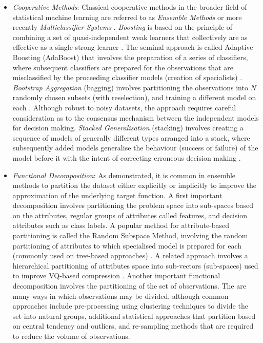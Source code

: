\begin{itemize}
	\item \emph{Cooperative Methods}: Classical cooperative methods in the broader field of statistical machine learning are referred to as \emph{Ensemble Methods} \cite{Opitz1999, Polikar2006} or more recently \emph{Multiclassifier Systems} \cite{Ghosh2002}. \emph{Boosting} is based on the principle of combining a set of quasi-independent weak learners that collectively are as effective as a single strong learner \cite{Kearns1988, Schapire1992}. The seminal approach is called Adaptive Boosting (AdaBoost) that involves the preparation of a series of classifiers, where subsequent classifiers are prepared for the observations that are misclassified by the proceeding classifier models (creation of specialists) \cite{Schapire2003}. \emph{Bootstrap Aggregation} (bagging) involves partitioning the observations into $N$ randomly chosen subsets (with reselection), and training a different model on each \cite{Breiman1996}. Although robust to noisy datasets, the approach requires careful consideration as to the consensus mechanism between the independent models for decision making. \emph{Stacked Generalisation} (stacking) involves creating a sequence of models of generally different types arranged into a stack, where subsequently added models generalise the behaviour (success or failure) of the model before it with the intent of correcting erroneous decision making \cite{Wolpert1992, Ting1999}. 
	
	\item \emph{Functional Decomposition}: As demonstrated, it is common in ensemble methods to partition the dataset either explicitly or implicitly to improve the approximation of the underlying target function. A first important decomposition involves partitioning the problem space into sub-spaces based on the attributes, regular groups of attributes called features, and decision attributes such as class labels. A popular method for attribute-based partitioning is called the Random Subspace Method, involving the random partitioning of attributes to which specialised model is prepared for each (commonly used on tree-based approaches) \cite{Ho1998}. A related approach involves a hierarchical partitioning of attributes space into sub-vectors (sub-spaces) used to improve VQ-based compression \cite{Gersho1984}. Another important functional decomposition involves the partitioning of the set of observations. The are many ways in which observations may be divided, although common approaches include pre-processing using clustering techniques to divide the set into natural groups, additional statistical approaches that partition based on central tendency and outliers, and re-sampling methods that are required to reduce the volume of observations.
	

\end{itemize}
